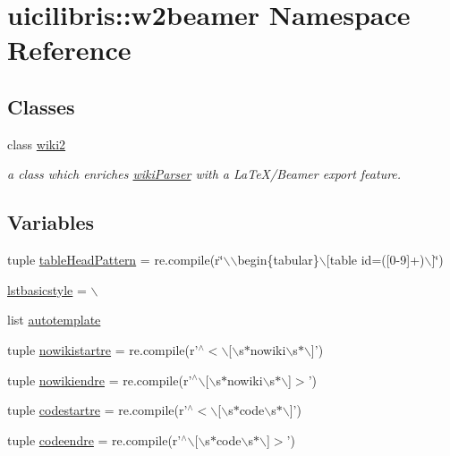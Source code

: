 \hypertarget{namespaceuicilibris_1_1w2beamer}{\section{uicilibris\-:\-:w2beamer \-Namespace \-Reference}
\label{namespaceuicilibris_1_1w2beamer}
}
\subsection*{\-Classes}
\begin{DoxyCompactItemize}
\item 
class \hyperlink{classuicilibris_1_1w2beamer_1_1wiki2}{wiki2}
\begin{DoxyCompactList}\small\item\em a class which enriches \hyperlink{namespaceuicilibris_1_1wikiParser}{wiki\-Parser} with a \-La\-Te\-X/\-Beamer export feature. \end{DoxyCompactList}\end{DoxyCompactItemize}
\subsection*{\-Variables}
\begin{DoxyCompactItemize}
\item 
tuple \hyperlink{namespaceuicilibris_1_1w2beamer_a3f4c9d7ef11e43b61fbe6699a65b2c56}{table\-Head\-Pattern} = re.\-compile(r\char`\"{}$\backslash$$\backslash$begin\{tabular\}$\backslash$\mbox{[}table id=(\mbox{[}0-\/9\mbox{]}+)$\backslash$\mbox{]}\char`\"{})
\item 
\hyperlink{namespaceuicilibris_1_1w2beamer_a20293542377aa84d3645ff8ca489dc25}{lstbasicstyle} = $\backslash$
\item 
list \hyperlink{namespaceuicilibris_1_1w2beamer_aa5c548665b6cd95f2755accca3907374}{autotemplate}
\item 
tuple \hyperlink{namespaceuicilibris_1_1w2beamer_ad51b396b118fa48819396baec8fcd981}{nowikistartre} = re.\-compile(r'$^\wedge$$<$$\backslash$\mbox{[}$\backslash$s$\ast$nowiki$\backslash$s$\ast$$\backslash$\mbox{]}')
\item 
tuple \hyperlink{namespaceuicilibris_1_1w2beamer_a10aa1adbb79cef7023740fb735a22c97}{nowikiendre} = re.\-compile(r'$^\wedge$$\backslash$\mbox{[}$\backslash$s$\ast$nowiki$\backslash$s$\ast$$\backslash$\mbox{]}$>$')
\item 
tuple \hyperlink{namespaceuicilibris_1_1w2beamer_abec3afbb11dc65299cf5d94b763260b1}{codestartre} = re.\-compile(r'$^\wedge$$<$$\backslash$\mbox{[}$\backslash$s$\ast$code$\backslash$s$\ast$$\backslash$\mbox{]}')
\item 
tuple \hyperlink{namespaceuicilibris_1_1w2beamer_a2123e1d68e83d4c118716ea256b043e2}{codeendre} = re.\-compile(r'$^\wedge$$\backslash$\mbox{[}$\backslash$s$\ast$code$\backslash$s$\ast$$\backslash$\mbox{]}$>$')
\end{DoxyCompactItemize}


